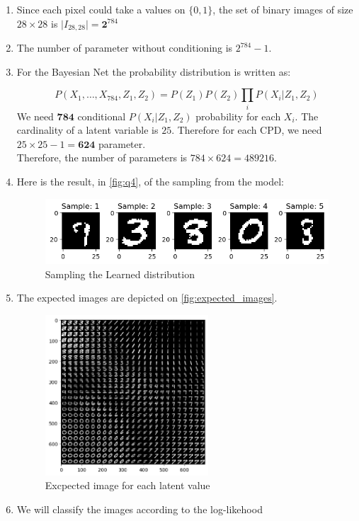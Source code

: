\documentclass[10pt]{article}
\begin{document}
\begin{enumerate}
  \item  Since each pixel could take a values on $\{0,1\}$, the set of binary
    images of size $28\times 28$ is $\vert I_{28,28}\vert =\mathbf{2}^{784}$
  \item The number of parameter without conditioning is $2^{784} - 1$. 
  \item  For the Bayesian Net the probability distribution is written as:

    \begin{equation}
      P(X_1,\ldots, X_{784}, Z_1, Z_2) =  P(Z_1)P(Z_2) \prod_i P(X_i|Z_1, Z_2)
    \end{equation}
    We need $\mathbf{784}$ conditional $P(X_i|Z_1, Z_2)$ probability for each
    $X_i$. The cardinality of a latent variable is $25$. Therefore for each
    CPD, we need $25\times 25 -1 = \mathbf{624}$ parameter.\\

    Therefore, the number of parameters is $784\times 624 = 489216$.
  \item  Here is the result, in \autoref{fig:q4},  of the sampling from the model:

    \begin{figure}[htpb]
      \centering
      \includegraphics[width=0.8\linewidth]{./programming/a4.png}
      \caption{Sampling the Learned distribution}%
      \label{fig:q4}
    \end{figure}
  \item The expected images are depicted on \autoref{fig:expected_images}.

    \begin{figure}[htpb]
      \centering
      \includegraphics[width=0.8\linewidth, height=6cm]{./programming/a5.png}
      \caption{Excpected image for each latent value}%
      \label{fig:expected_images}
    \end{figure}
  \item We will classify the images according to the log-likehood


\end{enumerate}
\end{document}
